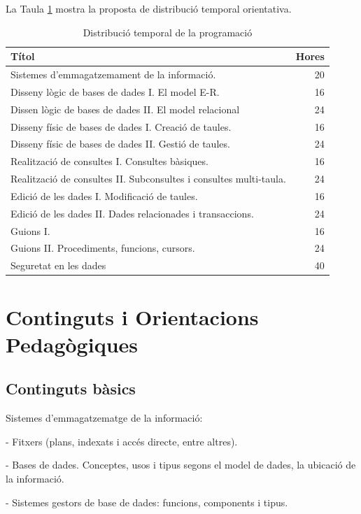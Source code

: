 \documentclass[catalan, a4paper, 12pt, titlepage]{article}
\begin{document}
La Taula \ref{tab:distribuciotemporal} mostra la proposta de distribució temporal orientativa.

\begin{table}
	\centering
\begin{tabular}{lr}
 Títol & Hores\\
 \hline
 Sistemes d'emmagatzemament de la informació. & 20\\
 Disseny lògic de bases de dades I. El model E-R. & 16  \\
 Dissen lògic de bases de dades II. El model relacional& 24\\
 Disseny físic de bases de dades I. Creació de taules. & 16 \\
 Disseny físic de bases de dades II. Gestió de taules. & 24 \\
 Realització de consultes I. Consultes bàsiques. & 16 \\
 Realització de consultes II. Subconsultes i consultes multi-taula. & 24 \\
 Edició de les dades I. Modificació de taules. & 16\\
 Edició de les dades II. Dades relacionades i transaccions. & 24\\
 Guions I. & 16 \\
 Guions II. Procediments, funcions, cursors. & 24 \\
 Seguretat en les dades & 40 \\
\end{tabular}
	\caption{Distribució temporal de la programació} \label{tab:distribuciotemporal}
\end{table}

\section{Continguts i Orientacions Pedagògiques}

\subsection{Continguts bàsics}

Sistemes d'emmagatzematge de la informació:

- Fitxers (plans, indexats i accés directe, entre altres).

- Bases de dades. Conceptes, usos i tipus segons el model de dades, la ubicació de la informació.

- Sistemes gestors de base de dades: funcions, components i tipus.
\end{document}

